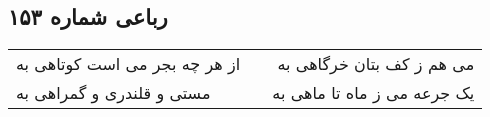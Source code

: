 \begin{center}
\section*{رباعی شماره ۱۵۳}
\label{sec:sh153}
\begin{longtable}{l p{0.5cm} r}
از هر چه بجر می است کوتاهی به
&&
می هم ز کف بتان خرگاهی به
\\
مستی و قلندری و گمراهی به
&&
یک جرعه می ز ماه تا ماهی به
\\
\end{longtable}
\end{center}

